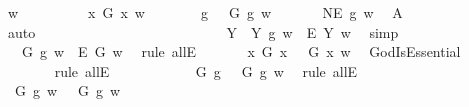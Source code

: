 \begin{isabellebody}
\ w\ \isanewline
\ \ \isacommand{{\isacharbraceleft}}\isamarkupfalse%
\isanewline
\ \ \ \ \isamarkupfalse%
\ {\isachardoublequoteopen}{\isasymexists}x{\isachardot}\ G\ x\ w{\isachardoublequoteclose}\isanewline
\ \ \ \ \isamarkupfalse%
\ \isamarkupfalse%
\ g\ \ {}{\isacharcolon}\ {\isachardoublequoteopen}G\ g\ w{\isachardoublequoteclose}\ \isacommand{{\isachardot}{\isachardot}}\isamarkupfalse%
\isanewline
\ \ \ \ \isamarkupfalse%
\ {\isachardoublequoteopen}NE\ g\ w{\isachardoublequoteclose}\ \isamarkupfalse%
\ A{}\ \isamarkupfalse%
\ auto\ \ \ \ \ \ \ \ \ \ \ \ \ \ \ \ \ \ \ \ \ %
\isanewline
\ \ \ \ \isamarkupfalse%
\ {\isachardoublequoteopen}{\isasymforall}Y{\isachardot}\ {\isacharparenleft}{\isasymE}\ Y\ g\ w{\isacharparenright}\ {\isasymlongrightarrow}\ {\isacharparenleft}\isactrlbold {\isasymbox}\isactrlbold {\isasymexists}\isactrlsup E\ Y{\isacharparenright}\ w{\isachardoublequoteclose}\ \isamarkupfalse%
\ simp\isanewline
\ \ \ \ \isamarkupfalse%
\ {}{\isacharcolon}\ {\isachardoublequoteopen}{\isacharparenleft}{\isasymE}\ G\ g\ w{\isacharparenright}\ {\isasymlongrightarrow}\ {\isacharparenleft}\isactrlbold {\isasymbox}\isactrlbold {\isasymexists}\isactrlsup E\ G{\isacharparenright}\ w{\isachardoublequoteclose}\ \isamarkupfalse%
\ {\isacharparenleft}rule\ allE{\isacharparenright}\isanewline
\ \ \ \ \isamarkupfalse%
\ \ {\isachardoublequoteopen}{\isacharparenleft}\isactrlbold {\isasymforall}x{\isachardot}\ G\ x\ \isactrlbold {\isasymrightarrow}\ {\isacharparenleft}{\isasymE}\ G\ x{\isacharparenright}{\isacharparenright}\ w{\isachardoublequoteclose}\ \isamarkupfalse%
\ GodIsEssential\isanewline
\ \ \ \ \ \ \isamarkupfalse%
\ {\isacharparenleft}rule\ allE{\isacharparenright}\ \ \ \ \ %
\isanewline
\ \ \ \ \isamarkupfalse%
\ \ {\isachardoublequoteopen}{\isacharparenleft}G\ g\ \isactrlbold {\isasymrightarrow}\ {\isacharparenleft}{\isasymE}\ G\ g{\isacharparenright}{\isacharparenright}\ w{\isachardoublequoteclose}\ \isamarkupfalse%
\ {\isacharparenleft}rule\ allE{\isacharparenright}\isanewline
\ \ \ \ \isamarkupfalse%
\ \ {\isachardoublequoteopen}G\ g\ w\ {\isasymlongrightarrow}\ {\isasymE}\ G\ g\ w{\isachardoublequoteclose}\ \isamarkupfalse%

\end{isabellebody}
